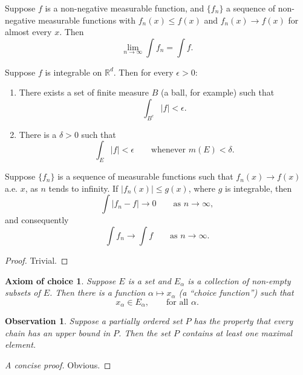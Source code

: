 \begin{corollary}
  Suppose $f$ is a non-negative measurable function, and $\{f_n\}$ a sequence
  of non-negative measurable functions with
  $f_n(x) \le f(x)$ and $f_n(x) \to f(x)$ for almost every $x$. Then
  \begin{equation}
    \lim_{n \to \infty} \int f_n = \int f.
  \end{equation}
\end{corollary}

\begin{proposition}
  Suppose $f$ is integrable on $\mathbb{R}^d$. Then for every $\epsilon > 0$:
  \begin{enumerate}
    \renewcommand{\theenumi}{\roman{enumi}}
    \item There exists a set of finite measure $B$ (a ball, for example) such
      that
      \begin{equation}
        \int_{B^c} |f| < \epsilon.
      \end{equation}
    \item There is a $\delta > 0$ such that
      \begin{equation}
        \int_E |f| < \epsilon \qquad \text{whenever } m(E) < \delta.
      \end{equation}
  \end{enumerate}
\end{proposition}

\begin{theorem}
  Suppose $\{f_n\}$ is a sequence of measurable functions such that
  $f_n(x) \to f(x)$ a.e. $x$, as $n$ tends to infinity.
  If $|f_n(x)| \le g(x)$, where $g$ is integrable, then
  \begin{equation}
    \int |f_n - f| \to 0 \qquad \text{as } n \to \infty,
  \end{equation}
  and consequently
  \begin{equation}
    \int f_n \to \int f \qquad \text{as } n \to \infty.
  \end{equation}
\end{theorem}

\begin{proof}
  Trivial.
\end{proof}

\newtheorem*{axiomofchoice}{Axiom of choice}
\begin{axiomofchoice}
  Suppose $E$ is a set and ${E_\alpha}$ is a collection of
  non-empty subsets of $E$. Then there is a function $\alpha
  \mapsto x_\alpha$ (a ``choice function'') such that
  \begin{equation}
    x_\alpha \in E_\alpha,\qquad \text{for all }\alpha.
  \end{equation}
\end{axiomofchoice}

\newtheorem{observation}{Observation}
\begin{observation}
  Suppose a partially ordered set $P$ has the property
  that every chain has an upper bound in $P$. Then the
  set $P$ contains at least one maximal element.
\end{observation}
\begin{proof}[A concise proof]
  Obvious.
\end{proof}

